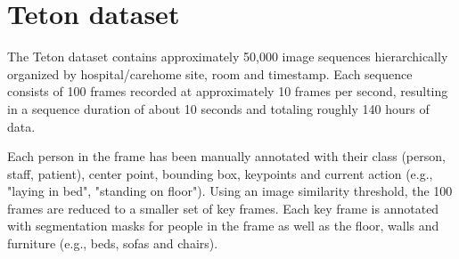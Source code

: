 \section{Teton dataset}
The Teton dataset contains approximately 50,000 image sequences hierarchically organized by hospital/carehome site, room and timestamp. Each sequence consists of 100 frames recorded at approximately 10 frames per second, resulting in a sequence duration of about 10 seconds and totaling roughly 140 hours of data. 

Each person in the frame has been manually annotated with their class (person, staff, patient), center point, bounding box, keypoints and current action (e.g., "laying in bed", "standing on floor"). Using an image similarity threshold, the 100 frames are reduced to a smaller set of key frames. Each key frame is annotated with segmentation masks for people in the frame as well as the floor, walls and furniture (e.g., beds, sofas and chairs).







